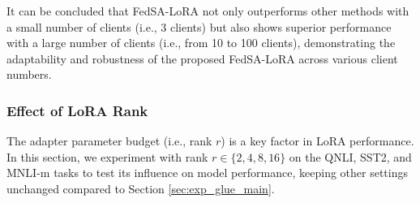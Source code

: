 \documentclass{article} %
\begin{document}
It can be concluded that FedSA-LoRA not only outperforms other methods with a small number of clients (i.e., 3 clients) but also shows superior performance with a large number of clients (i.e., from 10 to 100 clients), demonstrating the adaptability and robustness of the proposed FedSA-LoRA across various client numbers.

\clearpage

\begin{table}[t]
\caption{Performance comparison on the QNLI, SST2, and MNLI-m tasks with different number of clients. We apply full participation for FL system with 10 and 20 clients, and apply client sampling with rate 0.3 for FL system with 100 clients.}
\label{tab:ablation_clients_num}
\vspace{-0.3cm}
\begin{center}
\end{center}
\vspace{-0.5cm}
\end{table}


\vspace{-0.5cm}

\subsubsection{Effect of LoRA Rank}
\vspace{-0.1cm}

The adapter parameter budget (i.e., rank $r$) is a key factor in LoRA performance. In this section, we experiment with rank $r \in \{2, 4, 8, 16\}$ on the QNLI, SST2, and MNLI-m tasks to test its influence on model performance, keeping other settings unchanged compared to Section \ref{sec:exp_glue_main}.
\end{document}
